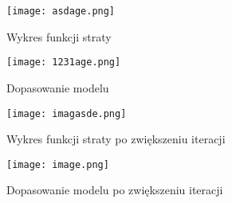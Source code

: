 \documentclass{article}
\begin{document}
\begin{figure}[H]
    \centering
    \begin{minipage}{0.45\textwidth}
        \texttt{[image: asdage.png]}
        \caption{Wykres funkcji straty}
    \end{minipage}
    \hfill
    \begin{minipage}{0.45\textwidth}
        \texttt{[image: 1231age.png]}
        \caption{Dopasowanie modelu}
    \end{minipage}
\end{figure}

\begin{figure}[H]
    \centering
    \begin{minipage}{0.45\textwidth}
        \texttt{[image: imagasde.png]}
        \caption{Wykres funkcji straty po zwiększeniu iteracji}
    \end{minipage}
    \hfill
    \begin{minipage}{0.45\textwidth}
        \texttt{[image: image.png]}
        \caption{Dopasowanie modelu po zwiększeniu iteracji}
    \end{minipage}
\end{figure}
\end{document}
